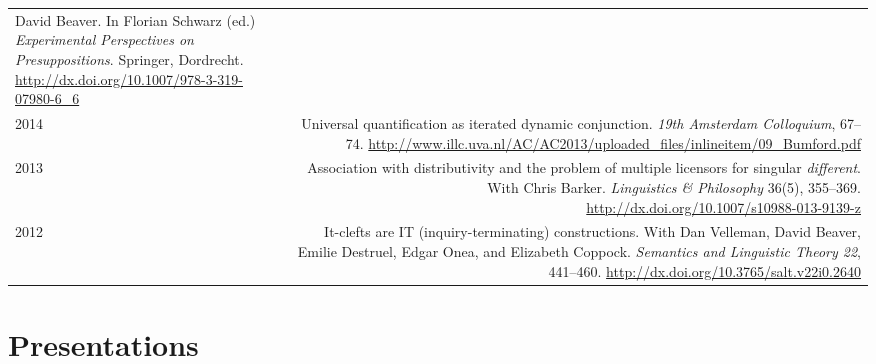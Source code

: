 \documentclass[12pt]{article}
\newcommand{\doi}[1]{\url{http://dx.doi.org/#1}}
\newcommand{\refmark}{\textcolor{gray}{}}
\begin{document}
\begin{longtable}{LR}
          David Beaver.\newline
          In Florian Schwarz (ed.) \textit{Experimental Perspectives on
          Presuppositions}. Springer, Dordrecht.\newline
          \doi{10.1007/978-3-319-07980-6_6}\\ %
  2014  & Universal quantification as iterated dynamic conjunction.\newline
          \textit{19th Amsterdam Colloquium}, 67--74.\newline
          \url{http://www.illc.uva.nl/AC/AC2013/uploaded_files/inlineitem/09_Bumford.pdf}\\
  2013  & Association with distributivity and the problem of multiple
          licensors for singular \textit{different}.\newline
          With Chris Barker.\newline
          \textit{Linguistics \& Philosophy} 36(5), 355--369.\newline
          \doi{10.1007/s10988-013-9139-z}\\ %
  2012  & It-clefts are IT (inquiry-terminating) constructions.\newline
          With Dan Velleman, David Beaver, Emilie Destruel, Edgar Onea, and
          Elizabeth Coppock.\newline
          \textit{Semantics and Linguistic Theory 22}, 441--460.\newline
          \doi{10.3765/salt.v22i0.2640}
\end{longtable}
\endgroup

\medskip

\section*{Presentations}
\end{document}
